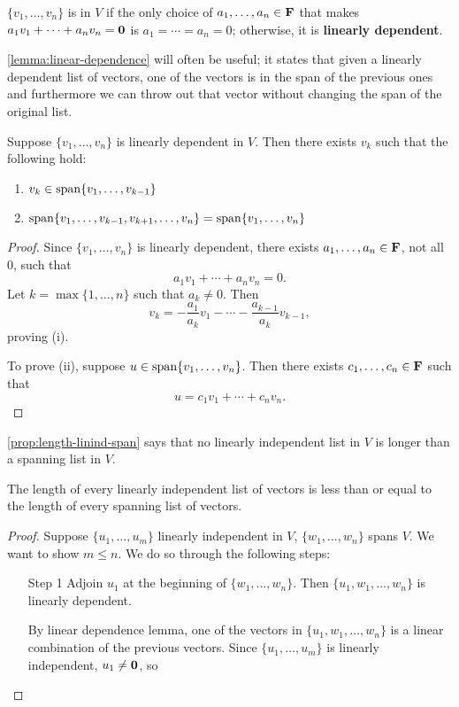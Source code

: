 \begin{definition}
$\{v_1,\dots,v_n\}$ is  in $V$ if the only choice of $a_1,\dots,a_n\in\mathbf F$ that makes $a_1v_1+\cdots+a_nv_n=\vb{0}$ is $a_1=\cdots=a_n=0$; otherwise, it is \textbf{linearly dependent}.
\end{definition}

\cref{lemma:linear-dependence} will often be useful; it states that given a linearly dependent list of vectors, one of the vectors is in the span of the previous ones and furthermore we can throw out that vector without changing the span of the original list.

\begin{lemma}\label{lemma:linear-dependence}
Suppose $\{v_1,\dots,v_n\}$ is linearly dependent in $V$. Then there exists $v_k$ such that the following hold:
\begin{enumerate}[label=(\roman*)]
\item $v_k\in\operatorname{span}\{v_1,\dots,v_{k-1}\}$
\item $\operatorname{span}\{v_1,\dots,v_{k-1},v_{k+1},\dots,v_n\}=\operatorname{span}\{v_1,\dots,v_n\}$
\end{enumerate}
\end{lemma}

\begin{proof}
Since $\{v_1,\dots,v_n\}$ is linearly dependent, there exists $a_1,\dots,a_n\in\mathbf F$, not all $0$, such that
\[a_1v_1+\cdots+a_nv_n=0.\]
Let $k=\max\{1,\dots,n\}$ such that $a_k\neq0$. Then
\[v_k=-\frac{a_1}{a_k}v_1-\cdots-\frac{a_{k-1}}{a_k}v_{k-1},\]
proving (i).

To prove (ii), suppose $u\in\operatorname{span}\{v_1,\dots,v_n\}$. Then there exists $c_1,\dots,c_n\in\mathbf F$ such that
\[u=c_1v_1+\cdots+c_nv_n.\]

\end{proof}

\cref{prop:length-linind-span} says that no linearly independent list in $V$ is longer than a spanning list in $V$.

\begin{proposition}\label{prop:length-linind-span}
The length of every linearly independent list of vectors is less than or equal to the length of every spanning list of vectors.
\end{proposition}

\begin{proof}
Suppose $\{u_1,\dots,u_m\}$ linearly independent in $V$, $\{w_1,\dots,w_n\}$ spans $V$. We want to show $m\le n$. We do so through the following steps:
\begin{itemize}
\item[Step 1] Adjoin $u_1$ at the beginning of $\{w_1,\dots,w_n\}$. Then $\{u_1,w_1,\dots,w_n\}$ is linearly dependent.

By linear dependence lemma, one of the vectors in $\{u_1,w_1,\dots,w_n\}$ is a linear combination of the previous vectors. Since $\{u_1,\dots,u_m\}$ is linearly independent, $u_1\neq\vb{0}$, so 
\end{itemize}
\end{proof}

